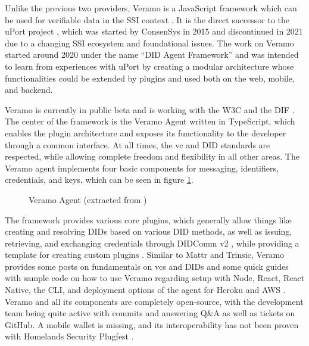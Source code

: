     Unlike the previous two providers, Veramo is a JavaScript framework which can be used for verifiable data in the SSI context \cite{veramo_veramo_2021-1}. It is the direct successor to the uPort project \cite{uport_uport_2021}, which was started by ConsenSys in 2015 and discontinued in 2021 due to a changing SSI ecosystem and foundational issues. The work on Veramo started around 2020 under the name “DID Agent Framework” and was intended to learn from experiences with uPort by creating a modular architecture whose functionalities could be extended by plugins and used both on the web, mobile, and backend. \cite{uport_veramo_2021}
    
    Veramo is currently in public beta and is working with the W3C and the DIF \cite{veramo_veramo_2021-1}. The center of the framework is the Veramo Agent written in TypeScript, which enables the plugin architecture and exposes its functionality to the developer through a common interface. At all times, the \ac{vc} and \ac{DID} standards are respected, while allowing complete freedom and flexibility in all other areas. The Veramo agent implements four basic components for messaging, identifiers, credentials, and keys, which can be seen in figure \ref{figure: veramo agent}. \cite{veramo_veramo_2021-2}
    
    \begin{figure}[ht]
	    \centering    	    \makebox[\textwidth]{}
        \caption{Veramo Agent (extracted from \cite{veramo_veramo_2021-2})}
        \label{figure: veramo agent}
    \end{figure}
    
    The framework provides various core plugins, which generally allow things like creating and resolving \acp{DID} based on various \ac{DID} methods, as well as issuing, retrieving, and exchanging credentials through DIDComm v2 \cite{veramo_veramo_2021-2, veramo_blog_2021}, while providing a template for creating custom plugins \cite{veramo_uport-projectveramo-plugin_2021}. Similar to Mattr and Trinsic, Veramo provides some posts on fundamentals on \acp{vc} and \acp{DID} and some quick guides with sample code on how to use Veramo regarding setup with Node, React, React Native, the CLI, and deployment options of the agent for Heroku and AWS \cite{veramo_veramo_2021-2}. Veramo and all its components are completely open-source, with the development team being quite active with commits and answering Q\&A as well as tickets on GitHub. A mobile wallet is missing, and its interoperability has not been proven \cite{homeland_security_interoperability_2021} with Homelands Security Plugfest .
    
